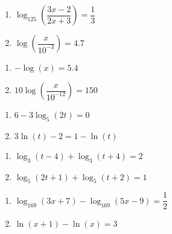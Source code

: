\begin{multicols}{2}
\begin{enumerate}
\setcounter{enumi}{\value{HW}}

\item $\log_{125} \left(\dfrac{3x-2}{2x+3}\right)=\dfrac{1}{3}$

\item $\log\left(\dfrac{x}{10^{-3}}\right) = 4.7$  \label{sixfourRichterequ}


\setcounter{HW}{\value{enumi}}
\end{enumerate}
\end{multicols}


\begin{multicols}{2}
\begin{enumerate}
\setcounter{enumi}{\value{HW}}

\item $-\log(x) = 5.4$  \label{sixfourpHequ}
\item $10\log\left(\dfrac{x}{10^{-12}}\right) = 150$ \label{sixfourdecibelequ}

\setcounter{HW}{\value{enumi}}
\end{enumerate}
\end{multicols}

\begin{multicols}{2}
\begin{enumerate}
\setcounter{enumi}{\value{HW}}

\item $6-3\log_{5}(2t)=0$
\item $3\ln(t)-2=1-\ln(t)$

\setcounter{HW}{\value{enumi}}
\end{enumerate}
\end{multicols}

\begin{multicols}{2}
\begin{enumerate}
\setcounter{enumi}{\value{HW}}

\item $\log_{3}(t - 4) + \log_{3}(t + 4) = 2$

\item $\log_{5}(2t + 1) + \log_{5}(t + 2) = 1$

\setcounter{HW}{\value{enumi}}
\end{enumerate}
\end{multicols}

\begin{multicols}{2}
\begin{enumerate}
\setcounter{enumi}{\value{HW}}

\item $\log_{169}(3x + 7) - \log_{169}(5x - 9) = \dfrac{1}{2}$

\item $\ln(x+1) - \ln(x) = 3$ 

\setcounter{HW}{\value{enumi}}
\end{enumerate}
\end{multicols}

